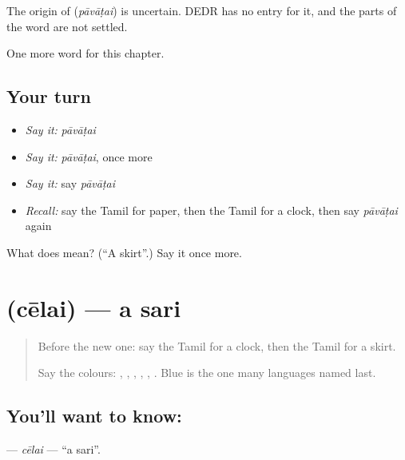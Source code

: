 \begin{cousinweb}
The origin of \textbf{} (\emph{pāvāṭai}) is uncertain. DEDR has no entry for it, and the parts of the word are not settled.
\end{cousinweb}

\begin{grammarlens}[title={What you've built}]
One more word for this chapter.
\end{grammarlens}

\subsection*{Your turn}
\begin{itemize}
\raggedright
  \item \emph{Say it:} \emph{pāvāṭai}
  \item \emph{Say it:} \emph{pāvāṭai}, once more
  \item \emph{Say it:} say \emph{pāvāṭai}
  \item \emph{Recall:} say the Tamil for paper, then the Tamil for a clock, then say \emph{pāvāṭai} again
\end{itemize}

\begin{tcolorbox}[breakable,colback=teal!4,colframe=teal!35!black,title={Before you move on}]
What does  mean? (\textquotedblleft{}A skirt\textquotedblright{}.) Say it once more.
\end{tcolorbox}
\section[\texorpdfstring{\ta{சேலை} (cēlai)}{சேலை (cēlai)}]{ (cēlai) — a sari}

\label{lesson:TA-C121-celai}



\begin{quote}
Before the new one: say the Tamil for a clock, then the Tamil for a skirt.

Say the colours: \textbf{}, \textbf{}, \textbf{}, \textbf{}, \textbf{}, \textbf{}. Blue is the one many languages named last.
\end{quote}

\subsection*{You'll want to know: }
\textbf{} — \emph{cēlai} — \textquotedblleft{}a sari\textquotedblright{}.

